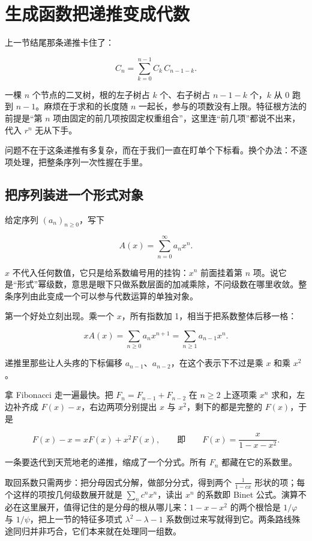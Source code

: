 \section{生成函数把递推变成代数}
\label{sec:04-Discrete-Mathematics/02-Recurrences/03}

上一节结尾那条递推卡住了：

\[
C_n=\sum_{k=0}^{n-1}C_k\,C_{n-1-k}.
\]

一棵 \(n\) 个节点的二叉树，根的左子树占 \(k\) 个、右子树占 \(n-1-k\) 个，\(k\) 从 0 跑到 \(n-1\)。麻烦在于求和的长度随 \(n\) 一起长，参与的项数没有上限。特征根方法的前提是``第 \(n\) 项由固定的前几项按固定权重组合''，这里连``前几项''都说不出来，代入 \(r^{n}\) 无从下手。

问题不在于这条递推有多复杂，而在于我们一直在盯单个下标看。换个办法：不逐项处理，把整条序列一次性握在手里。

\subsection{把序列装进一个形式对象}

给定序列 \((a_n)_{n\ge0}\)，写下

\[
A(x)=\sum_{n=0}^{\infty}a_nx^{n}.
\]

\(x\) 不代入任何数值，它只是给系数编号用的挂钩：\(x^{n}\) 前面挂着第 \(n\) 项。说它是``形式''幂级数，意思是眼下只做系数层面的加减乘除，不问级数在哪里收敛。整条序列由此变成一个可以参与代数运算的单独对象。

第一个好处立刻出现。乘一个 \(x\)，所有指数加 1，相当于把系数整体后移一格：

\[
xA(x)=\sum_{n\ge0}a_nx^{n+1}=\sum_{n\ge1}a_{n-1}x^{n}.
\]

递推里那些让人头疼的下标偏移 \(a_{n-1}\)、\(a_{n-2}\)，在这个表示下不过是乘 \(x\) 和乘 \(x^{2}\)。

拿 Fibonacci 走一遍最快。把 \(F_n=F_{n-1}+F_{n-2}\) 在 \(n\ge2\) 上逐项乘 \(x^{n}\) 求和，左边补齐成 \(F(x)-x\)，右边两项分别提出 \(x\) 与 \(x^{2}\)，剩下的都是完整的 \(F(x)\)，于是

\[
F(x)-x=xF(x)+x^{2}F(x),
\qquad\text{即}\qquad
F(x)=\frac{x}{1-x-x^{2}}.
\]

一条要迭代到天荒地老的递推，缩成了一个分式。所有 \(F_n\) 都藏在它的系数里。

取回系数只需两步：把分母因式分解，做部分分式，得到两个 \(\frac{1}{1-cx}\) 形状的项；每个这样的项按几何级数展开就是 \(\sum_n c^{n}x^{n}\)，读出 \(x^{n}\) 的系数即 Binet 公式。演算不必在这里展开，值得记住的是分母的根从哪儿来：\(1-x-x^{2}\) 的两个根恰是 \(1/\varphi\) 与 \(1/\psi\)，把上一节的特征多项式 \(\lambda^{2}-\lambda-1\) 系数倒过来写就得到它。两条路线殊途同归并非巧合，它们本来就在处理同一组数。

